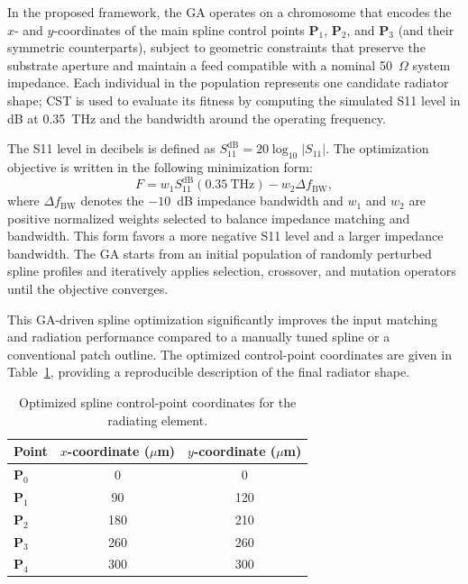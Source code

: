 \documentclass[USenglish]{article}
\begin{document}
In the proposed framework, the GA operates on a chromosome that encodes the $x$- and $y$-coordinates of the main spline control points $\mathbf{P}_1$, $\mathbf{P}_2$, and $\mathbf{P}_3$ (and their symmetric counterparts), subject to geometric constraints that preserve the substrate aperture and maintain a feed compatible with a nominal 50~$\Omega$ system impedance. Each individual in the population represents one candidate radiator shape; CST is used to evaluate its fitness by computing the simulated S11 level in dB at 0.35~THz and the bandwidth around the operating frequency.

The S11 level in decibels is defined as $S_{11}^{\mathrm{dB}}=20\log_{10}\lvert S_{11}\rvert$. The optimization objective is written in the following minimization form:
\[
F = w_1 S_{11}^{\mathrm{dB}}(0.35~\text{THz}) - w_2 \Delta f_{\text{BW}},
\]
where $\Delta f_{\text{BW}}$ denotes the \(-10\)~dB impedance bandwidth and $w_1$ and $w_2$ are positive normalized weights selected to balance impedance matching and bandwidth. This form favors a more negative S11 level and a larger impedance bandwidth. The GA starts from an initial population of randomly perturbed spline profiles and iteratively applies selection, crossover, and mutation operators until the objective converges.

This GA-driven spline optimization significantly improves the input matching and radiation performance compared to a manually tuned spline or a conventional patch outline. The optimized control-point coordinates are given in Table~\ref{tab:spline_points}, providing a reproducible description of the final radiator shape.

\begin{table}[ht]
\centering
\caption{Optimized spline control-point coordinates for the radiating element.}
\label{tab:spline_points}
\begin{tabular}{@{}lcc@{}}
\toprule
\textbf{Point} & \textbf{$x$-coordinate ($\mu$m)} & \textbf{$y$-coordinate ($\mu$m)} \\
\midrule
$\mathbf{P}_0$ & 0   & 0   \\
$\mathbf{P}_1$ & 90  & 120 \\
$\mathbf{P}_2$ & 180 & 210 \\
$\mathbf{P}_3$ & 260 & 260 \\
$\mathbf{P}_4$ & 300 & 300 \\
\bottomrule
\end{tabular}
\end{table}
\end{document}
